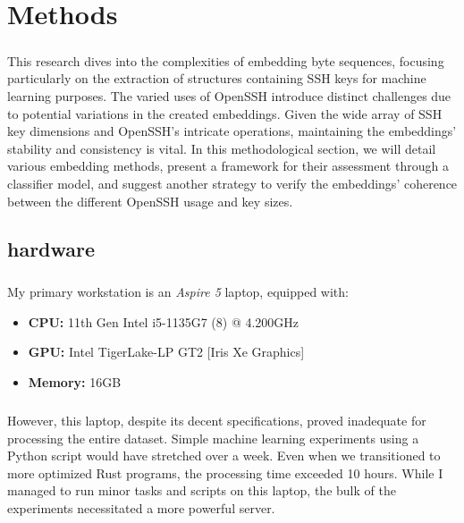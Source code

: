 \chapter{Methods}\label{chap:methods}
    \paragraph{}This research dives into the complexities of embedding byte sequences, focusing particularly on the extraction of structures containing SSH keys for machine learning purposes. The varied uses of OpenSSH introduce distinct challenges due to potential variations in the created embeddings. Given the wide array of SSH key dimensions and OpenSSH's intricate operations, maintaining the embeddings' stability and consistency is vital. In this methodological section, we will detail various embedding methods, present a framework for their assessment through a classifier model, and suggest another strategy to verify the embeddings' coherence between the different OpenSSH usage and key sizes.

    \section{hardware}
        \paragraph{}My primary workstation is an \textit{Aspire 5} laptop, equipped with:
        \begin{itemize}
            \item \textbf{CPU:} 11th Gen Intel i5-1135G7 (8) @ 4.200GHz 
            \item \textbf{GPU:} Intel TigerLake-LP GT2 [Iris Xe Graphics]
            \item \textbf{Memory:} 16GB
        \end{itemize}
        \paragraph{}However, this laptop, despite its decent specifications, proved inadequate for processing the entire dataset. Simple machine learning experiments using a Python script would have stretched over a week. Even when we transitioned to more optimized Rust programs, the processing time exceeded 10 hours. While I managed to run minor tasks and scripts on this laptop, the bulk of the experiments necessitated a more powerful server.
        
